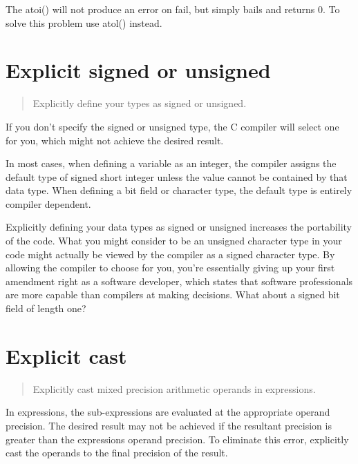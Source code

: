 \documentclass{report}
\begin{document}
The atoi() will not produce an error on fail, but simply bails and returns 0. To solve this problem use atol() instead. 


\section{Explicit signed or unsigned}
\begin{quote}
Explicitly define your types as signed or unsigned.
\end{quote}
If you don't specify the signed or unsigned type, the C compiler will select one for you, which might not achieve the desired result.

In most cases, when defining a variable as an integer, the compiler assigns the default type of signed short integer unless the value cannot be contained by that data type. When defining a bit field or character type, the default type is entirely compiler dependent.

Explicitly defining your data types as signed or unsigned increases the portability of the code. What you might consider to be an unsigned character type in your code might actually be viewed by the compiler as a signed character type. By allowing the compiler to choose for you, you're essentially giving up your first amendment right as a software developer, which states that software professionals are more capable than compilers at making decisions. What about a signed bit field of length one? 

\section{Explicit cast}
\begin{quote}
Explicitly cast mixed precision arithmetic operands in expressions.
\end{quote}
In expressions, the sub-expressions are evaluated at the appropriate operand precision. The desired result may not be achieved if the resultant precision is greater than the expressions operand precision. To eliminate this error, explicitly cast the operands to the final precision of the result.
\end{document}
